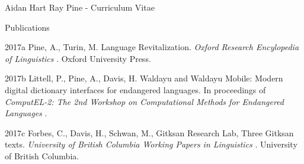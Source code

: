 \documentclass[12pt]{letter}
\begin{document}
\begin{cv}{ Aidan Hart Ray Pine  \space - \space   Curriculum Vitae}
\begin{cvlist}{Publications}
                                                                                                            \item[2017a]  Pine,  A.,  Turin,  M.  Language Revitalization. \textit{ Oxford Research Encylopedia of Linguistics }.  Oxford University Press.  
                                                                                \item[2017b] Littell, P., Pine, A., Davis, H.  Waldayu and Waldayu Mobile: Modern digital dictionary interfaces for endangered languages. In proceedings of \textit{ ComputEL-2: The 2nd Workshop on Computational Methods for Endangered Languages }.  
                                                                                \item[2017c]  Forbes,  C.,  Davis,  H.,  Schwan,  M.,  Gitksan Research Lab,   Three Gitksan texts. \textit{ University of British Columbia Working Papers in Linguistics }.  University of British Columbia.  
                                                        \end{cvlist}


\end{cv}
\end{document}
